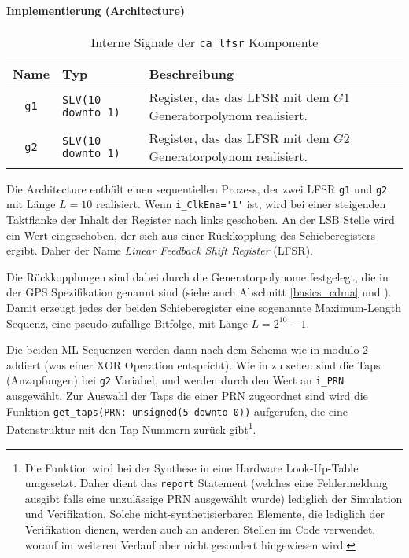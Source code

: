 \paragraph{Implementierung (Architecture)}

\begin{table}[htbp]
    \ttabbox
    {
        \caption[LFSR interne Signale]{Interne Signale der \lstinline$ca_lfsr$ Komponente}
        \label{TabCALFSR_ArchSignals}
    }
    {
    \begin{tabular}{c  p{2cm} p{6cm}}
        \toprule
        Name      & Typ         & Beschreibung \\
        \midrule
        \lstinline$g1$  & \lstinline$SLV(10 downto 1)$             & Register, das das LFSR mit dem $G1$ Generatorpolynom realisiert.\\
        \lstinline$g2$  & \lstinline$SLV(10 downto 1)$             & Register, das das LFSR mit dem $G2$ Generatorpolynom realisiert.\\
        \bottomrule
    \end{tabular}
}
\end{table}

Die Architecture enthält einen sequentiellen Prozess, der zwei \gls{LFSR} \lstinline$g1$ und \lstinline$g2$ mit Länge $L=10$ realisiert. Wenn \lstinline$i_ClkEna='1'$ ist, wird bei einer steigenden Taktflanke der Inhalt der Register nach links geschoben. An der LSB Stelle wird ein Wert eingeschoben, der sich aus einer Rückkopplung des Schieberegisters ergibt. Daher der Name \emph{Linear Feedback Shift Register} (LFSR).

Die Rückkopplungen sind dabei durch die Generatorpolynome festgelegt, die in der GPS Spezifikation \cite{specification2010gps} genannt sind (siehe auch Abschnitt \ref{basics_cdma} und ). Damit erzeugt jedes der beiden Schieberegister eine sogenannte Maximum-Length Sequenz, eine pseudo-zufällige Bitfolge, mit Länge $L=2^{10}-1$.

Die beiden ML-Sequenzen werden dann nach dem Schema wie in  modulo-2 addiert (was einer XOR Operation entspricht). Wie in  zu sehen sind die Taps (Anzapfungen) bei \lstinline$g2$ Variabel, und werden durch den Wert an \lstinline$i_PRN$ ausgewählt. Zur Auswahl der Taps die einer PRN zugeordnet sind wird die Funktion \lstinline$get_taps(PRN: unsigned(5 downto 0))$ aufgerufen, die  eine Datenstruktur mit den Tap Nummern zurück gibt\footnote{Die Funktion wird bei der Synthese in eine Hardware Look-Up-Table umgesetzt. Daher dient das \lstinline$report$ Statement (welches eine Fehlermeldung ausgibt falls eine unzulässige PRN ausgewählt wurde) lediglich der Simulation und Verifikation. Solche nicht-synthetisierbaren Elemente, die lediglich der Verifikation dienen, werden auch an anderen Stellen im Code verwendet, worauf im weiteren Verlauf aber nicht gesondert hingewiesen wird.}.

